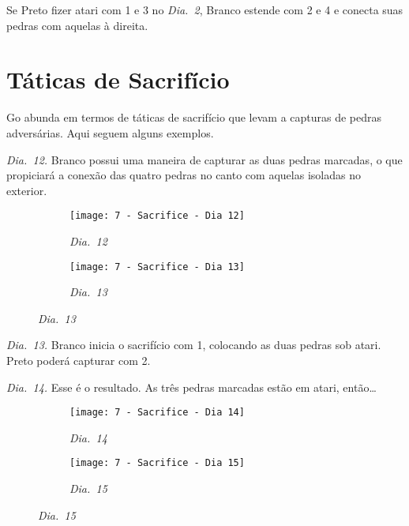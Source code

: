 Se Preto fizer atari com 1 e 3 no \emph{Dia.\@~2}, Branco estende com 2 e 4 e conecta suas pedras com aquelas à direita.

\pagebreak

\section{Táticas de Sacrifício}

Go abunda em termos de táticas de sacrifício que levam a capturas de pedras adversárias. Aqui seguem alguns exemplos.

\emph{Dia.\@~12.} Branco possui uma maneira de capturar as duas pedras marcadas, o que propiciará a conexão das quatro pedras no canto com aquelas isoladas no exterior.

\begin{figure}[h!]
    \centering
    \begin{subfigure}[t]{.31\textwidth}
        \texttt{[image: 7 - Sacrifice - Dia 12]}
        \captionsetup{justification=centering}
        \caption*{\emph{Dia.\@~12}}
    \end{subfigure}
    \hspace{1cm}
    \begin{subfigure}[t]{.31\textwidth}
        \texttt{[image: 7 - Sacrifice - Dia 13]}
        \captionsetup{justification=centering}
        \caption*{\emph{Dia.\@~13}}
    \end{subfigure}
\end{figure}

\emph{Dia.\@~13.} Branco inicia o sacrifício com 1, colocando as duas pedras sob atari. Preto poderá capturar com 2.

\emph{Dia.\@~14.} Esse é o resultado. As três pedras marcadas estão em atari, então\ldots

\begin{figure}[h!]
    \centering
    \begin{subfigure}[t]{.31\textwidth}
        \texttt{[image: 7 - Sacrifice - Dia 14]}
        \captionsetup{justification=centering}
        \caption*{\emph{Dia.\@~14}}
    \end{subfigure}
    \hspace{1cm}
    \begin{subfigure}[t]{.31\textwidth}
        \texttt{[image: 7 - Sacrifice - Dia 15]}
        \captionsetup{justification=centering}
        \caption*{\emph{Dia.\@~15}}
    \end{subfigure}
\end{figure}

